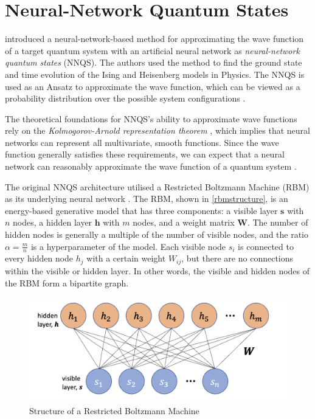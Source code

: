 \section{Neural-Network Quantum States}
 introduced a neural-network-based method for approximating the wave function of a target quantum system with an artificial neural network as \textit{neural-network quantum states} (NNQS). The authors used the method to find the ground state and time evolution of the Ising and Heisenberg models in Physics. The NNQS is used as an Ansatz to approximate the wave function, which can be viewed as a probability distribution over the possible system configurations \cite{b25}.

The theoretical foundations for NNQS's ability to approximate wave functions rely on the \textit{Kolmogorov-Arnold representation theorem} \cite{kolmogorov1957representation}, which implies that neural networks can represent all multivariate, smooth functions. Since the wave function generally satisfies these requirements, we can expect that a neural network can reasonably approximate the wave function of a quantum system \cite{b20}.

The original NNQS architecture utilised a Restricted Boltzmann Machine (RBM) as its underlying neural network \cite{b20}. The RBM, shown in \autoref{rbmstructure}, is an energy-based generative model that has three components: a visible layer $\boldsymbol{s}$ with $n$ nodes, a hidden layer $\boldsymbol{h}$ with $m$ nodes, and a weight matrix $\mathbf{W}$. The number of hidden nodes is generally a multiple of the number of visible nodes, and the ratio $\alpha = \frac{m}{n}$ is a hyperparameter of the model. Each visible node $s_i$ is connected to every hidden node $h_j$ with a certain weight $W_{ij}$, but there are no connections within the visible or hidden layer. In other words, the visible and hidden nodes of the RBM form a bipartite graph.
\begin{figure}[htb!]
    \centering
    \includegraphics[width=0.7\linewidth]{images/rbm_diagram.png}
    \caption{Structure of a Restricted Boltzmann Machine}
    \label{rbmstructure}
\end{figure}


